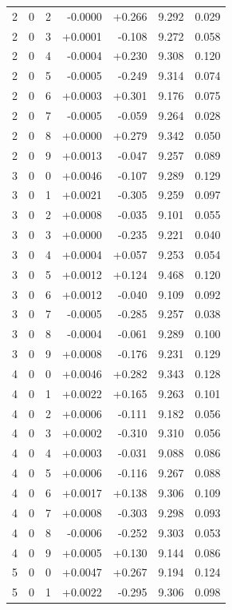 \documentclass[10pt]{article}
\begin{document}
\begin{longtable}{llrrrrr}
2 & 0 & 2 & -0.0000 & +0.266 & 9.292 & 0.029 \\
2 & 0 & 3 & +0.0001 & -0.108 & 9.272 & 0.058 \\
2 & 0 & 4 & -0.0004 & +0.230 & 9.308 & 0.120 \\
2 & 0 & 5 & -0.0005 & -0.249 & 9.314 & 0.074 \\
2 & 0 & 6 & +0.0003 & +0.301 & 9.176 & 0.075 \\
2 & 0 & 7 & -0.0005 & -0.059 & 9.264 & 0.028 \\
2 & 0 & 8 & +0.0000 & +0.279 & 9.342 & 0.050 \\
2 & 0 & 9 & +0.0013 & -0.047 & 9.257 & 0.089 \\
3 & 0 & 0 & +0.0046 & -0.107 & 9.289 & 0.129 \\
3 & 0 & 1 & +0.0021 & -0.305 & 9.259 & 0.097 \\
3 & 0 & 2 & +0.0008 & -0.035 & 9.101 & 0.055 \\
3 & 0 & 3 & +0.0000 & -0.235 & 9.221 & 0.040 \\
3 & 0 & 4 & +0.0004 & +0.057 & 9.253 & 0.054 \\
3 & 0 & 5 & +0.0012 & +0.124 & 9.468 & 0.120 \\
3 & 0 & 6 & +0.0012 & -0.040 & 9.109 & 0.092 \\
3 & 0 & 7 & -0.0005 & -0.285 & 9.257 & 0.038 \\
3 & 0 & 8 & -0.0004 & -0.061 & 9.289 & 0.100 \\
3 & 0 & 9 & +0.0008 & -0.176 & 9.231 & 0.129 \\
4 & 0 & 0 & +0.0046 & +0.282 & 9.343 & 0.128 \\
4 & 0 & 1 & +0.0022 & +0.165 & 9.263 & 0.101 \\
4 & 0 & 2 & +0.0006 & -0.111 & 9.182 & 0.056 \\
4 & 0 & 3 & +0.0002 & -0.310 & 9.310 & 0.056 \\
4 & 0 & 4 & +0.0003 & -0.031 & 9.088 & 0.086 \\
4 & 0 & 5 & +0.0006 & -0.116 & 9.267 & 0.088 \\
4 & 0 & 6 & +0.0017 & +0.138 & 9.306 & 0.109 \\
4 & 0 & 7 & +0.0008 & -0.303 & 9.298 & 0.093 \\
4 & 0 & 8 & -0.0006 & -0.252 & 9.303 & 0.053 \\
4 & 0 & 9 & +0.0005 & +0.130 & 9.144 & 0.086 \\
5 & 0 & 0 & +0.0047 & +0.267 & 9.194 & 0.124 \\
5 & 0 & 1 & +0.0022 & -0.295 & 9.306 & 0.098 \\

\end{longtable}
\end{document}

